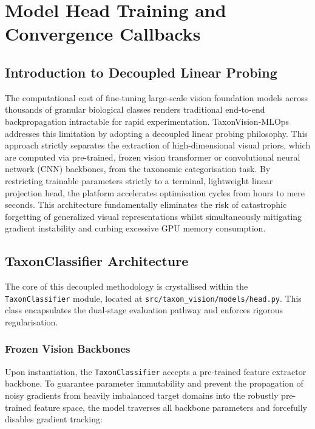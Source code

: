 \chapter{Model Head Training and Convergence Callbacks}
\label{chap:model_head_training}

\section{Introduction to Decoupled Linear Probing}

The computational cost of fine-tuning large-scale vision foundation models across thousands of granular biological classes renders traditional end-to-end backpropagation intractable for rapid experimentation. TaxonVision-MLOps addresses this limitation by adopting a decoupled linear probing philosophy. This approach strictly separates the extraction of high-dimensional visual priors, which are computed via pre-trained, frozen vision transformer or convolutional neural network (CNN) backbones, from the taxonomic categorisation task. By restricting trainable parameters strictly to a terminal, lightweight linear projection head, the platform accelerates optimisation cycles from hours to mere seconds. This architecture fundamentally eliminates the risk of catastrophic forgetting of generalized visual representations whilst simultaneously mitigating gradient instability and curbing excessive GPU memory consumption.



\section{TaxonClassifier Architecture}
\label{sec:taxonclassifier_architecture}

The core of this decoupled methodology is crystallised within the \texttt{TaxonClassifier} module, located at \texttt{src/taxon\_vision/models/head.py}. This class encapsulates the dual-stage evaluation pathway and enforces rigorous regularisation.

\subsection{Frozen Vision Backbones}

Upon instantiation, the \texttt{TaxonClassifier} accepts a pre-trained feature extractor backbone. To guarantee parameter immutability and prevent the propagation of noisy gradients from heavily imbalanced target domains into the robustly pre-trained feature space, the model traverses all backbone parameters and forcefully disables gradient tracking:

